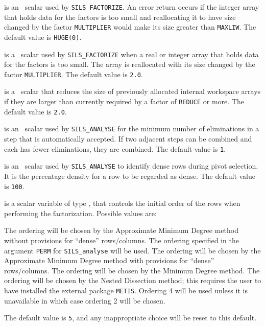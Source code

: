 \documentclass{galahad}
\newcommand{\packagename}{SILS}
\begin{document}
\begin{description}
 is an \integer\ scalar used by {\tt \packagename\_FACTORIZE}. 
An error 
return occurs if the integer array that holds data for the factors is too 
small and reallocating it to have size changed by the factor {\tt MULTIPLIER} 
would make its size greater than {\tt MAXLIW}. The default value is 
{\tt HUGE(0)}. 
 
 is a \realdp\ scalar used by {\tt \packagename\_FACTORIZE} 
when a real or integer array that holds data for the factors is too small. The 
array is reallocated with its size changed by the factor {\tt MULTIPLIER}. 
The default value is {\tt 2.0}.
 
 is a \realdp\ scalar that reduces the size of previously 
allocated 
internal workspace arrays if they are larger than currently required 
by a factor of {\tt REDUCE} or more. The default value is {\tt 2.0}.
 
 is an \integer\ scalar used by {\tt \packagename\_ANALYSE} for the 
  minimum number of eliminations in a step that is automatically 
  accepted. If two adjacent steps can be combined and each has fewer 
  eliminations, they are combined.  The default value is {\tt 1}. 
 
 is an \integer\ scalar used by {\tt \packagename\_ANALYSE} to 
identify dense 
rows during pivot selection.  It is the percentage density for a row to 
be regarded as dense.  The default value is {\tt 100}. 
 
 is a scalar variable of type \integer, that 
controls the initial order of the rows when performing the factorization.
Possible values are: 
\begin{description} 
 The ordering will be chosen by the Approximate Minimum Degree method
       without provisions for ``dense'' rows/columns.
 The ordering specified in the argument {\tt PERM} for 
       {\tt \packagename\_analyse} will be used.
 The ordering will be chosen by the Approximate Minimum Degree method
       with provisions for ``dense'' rows/columns.
 The ordering will be chosen by the Minimum Degree method.
 The ordering will be chosen by the Nested Dissection method; this
 requires the user to have installed the external package {\tt METIS}.
 Ordering 4 will be used unless it is unavailable in which case 
ordering 2 will be chosen.
\end{description} 
The default value is {\tt 5}, and any inappropriate choice
will be reset to this default.


\end{description}
\end{document}
